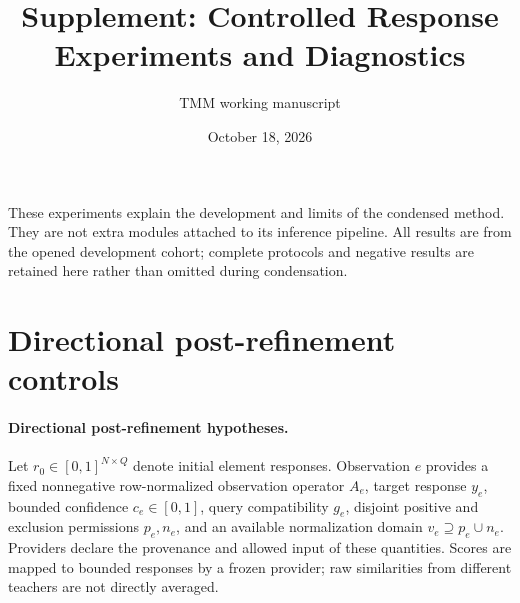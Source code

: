 \documentclass[10pt]{article}
\title{Supplement: Controlled Response Experiments and Diagnostics}
\author{TMM working manuscript}
\date{October 18, 2026}
\begin{document}
\maketitle
These experiments explain the development and limits of the condensed method.
They are not extra modules attached to its inference pipeline. All results are
from the opened development cohort; complete protocols and negative results are
retained here rather than omitted during condensation.
\section{Directional post-refinement controls}
\paragraph{Directional post-refinement hypotheses.}
Let $r_0\in[0,1]^{N\times Q}$ denote initial element responses. Observation $e$
provides a fixed nonnegative row-normalized observation operator $A_e$, target
response $y_e$, bounded confidence $c_e\in[0,1]$, query compatibility $g_e$,
disjoint positive and exclusion permissions $p_e,n_e$, and an available
normalization domain $v_e\supseteq p_e\cup n_e$. Providers declare the provenance and allowed input
of these quantities. Scores are mapped to bounded responses by a frozen
provider; raw similarities from different teachers are not directly averaged.
\end{document}

